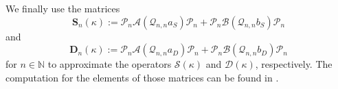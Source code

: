 \documentclass{article}
\renewcommand{\vec}[1]{\boldsymbol{#1}}
\newcommand{\set}[1]{\left\{#1\right\}}
\renewcommand{\vec}[1]{\boldsymbol{#1}}
\begin{document}
	We finally  use the matrices
	\begin{equation*}
		\vec{S}_n(\kappa):=\mathcal{P}_n\mathcal{A}(\mathcal{Q}_{n,n}a_S)\mathcal{P}_n+\mathcal{P}_n\mathcal{B}(\mathcal{Q}_{n,n}b_S)\mathcal{P}_n
	\end{equation*}
	and
	\begin{equation*}
		\vec{D}_n(\kappa):=\mathcal{P}_n\mathcal{A}(\mathcal{Q}_{n,n}a_D)\mathcal{P}_n+\mathcal{P}_n\mathcal{B}(\mathcal{Q}_{n,n}b_D)\mathcal{P}_n
	\end{equation*}
	for $n\in\mathbb{N}$ to approximate the operators $\mathcal{S}(\kappa)$ and $\mathcal{D}(\kappa)$, respectively. The computation for the elements of those matrices can be found in \cite{MaSun2023JSC}.
	
	
\end{document}
